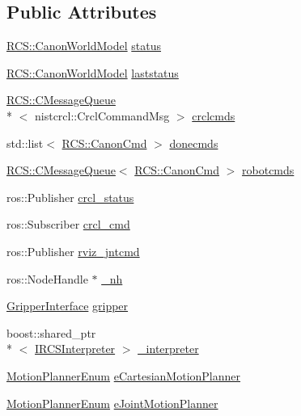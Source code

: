 \subsection*{Public Attributes}
\begin{DoxyCompactItemize}
\item 
\hyperlink{structRCS_1_1CanonWorldModel}{R\-C\-S\-::\-Canon\-World\-Model} \hyperlink{structRCS_1_1CController_a82e9cc233cd25554964efe8a9008e0b2}{status}
\item 
\hyperlink{structRCS_1_1CanonWorldModel}{R\-C\-S\-::\-Canon\-World\-Model} \hyperlink{structRCS_1_1CController_af76ac9412dbefbaebc970d62f88a40fa}{laststatus}
\item 
\hyperlink{classRCS_1_1CMessageQueue}{R\-C\-S\-::\-C\-Message\-Queue}\\*
$<$ nistcrcl\-::\-Crcl\-Command\-Msg $>$ \hyperlink{structRCS_1_1CController_a90aefbaf6e37b3902951d48365e6c6da}{crclcmds}
\item 
std\-::list$<$ \hyperlink{structRCS_1_1CanonCmd}{R\-C\-S\-::\-Canon\-Cmd} $>$ \hyperlink{structRCS_1_1CController_a1801fcf66f2d28f00bf91f65634ae4df}{donecmds}
\item 
\hyperlink{classRCS_1_1CMessageQueue}{R\-C\-S\-::\-C\-Message\-Queue}$<$ \hyperlink{structRCS_1_1CanonCmd}{R\-C\-S\-::\-Canon\-Cmd} $>$ \hyperlink{structRCS_1_1CController_a6704a1f1b72409d251222738086b21c1}{robotcmds}
\item 
ros\-::\-Publisher \hyperlink{structRCS_1_1CController_a059fc88d65194dc7a78737b80cd88628}{crcl\-\_\-status}
\item 
ros\-::\-Subscriber \hyperlink{structRCS_1_1CController_a68d8609778f84a1f4648270d57bcbf8a}{crcl\-\_\-cmd}
\item 
ros\-::\-Publisher \hyperlink{structRCS_1_1CController_a53d259a8d8c319b8f118f37eb010ff5e}{rviz\-\_\-jntcmd}
\item 
ros\-::\-Node\-Handle $\ast$ \hyperlink{structRCS_1_1CController_aded52f628534d0ebf9558b49b9314fef}{\-\_\-nh}
\item 
\hyperlink{classGripperInterface}{Gripper\-Interface} \hyperlink{structRCS_1_1CController_a99ad3b40383ec1a48e55a56f1a91771f}{gripper}
\item 
boost\-::shared\-\_\-ptr\\*
$<$ \hyperlink{classRCS_1_1IRCSInterpreter}{I\-R\-C\-S\-Interpreter} $>$ \hyperlink{structRCS_1_1CController_ae5d5ab2480680d7db766f7810232b696}{\-\_\-interpreter}
\item 
\hyperlink{structRCS_1_1CController_a50ede7cd9f47204828f0f7c740dc09b1}{Motion\-Planner\-Enum} \hyperlink{structRCS_1_1CController_a4174fd5467045e780fe53bde42e70735}{e\-Cartesian\-Motion\-Planner}
\item 
\hyperlink{structRCS_1_1CController_a50ede7cd9f47204828f0f7c740dc09b1}{Motion\-Planner\-Enum} \hyperlink{structRCS_1_1CController_ad788d0def2101be74b680394bcbc78e7}{e\-Joint\-Motion\-Planner}
\end{DoxyCompactItemize}
